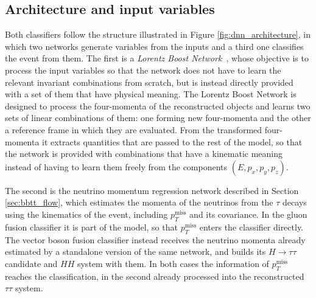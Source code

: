 \subsection{Architecture and input variables}
%
Both classifiers follow the structure illustrated in Figure \ref{fig:dnn_architecture}, in which two networks generate variables from the inputs and a third one classifies the event from them. The first is a \textit{Lorentz Boost Network}~\cite{LBN}, whose objective is to process the input variables so that the network does not have to learn the relevant invariant combinations from scratch, but is instead directly provided with a set of them that have physical meaning. The Lorentz Boost Network is designed to process the four-momenta of the reconstructed objects and learns two sets of linear combinations of them: one forming new four-momenta and the other a reference frame in which they are evaluated. From the transformed four-momenta it extracts quantities that are passed to the rest of the model, so that the network is provided with combinations that have a kinematic meaning instead of having to learn them freely from the components $(E, p_x, p_y, p_z)$.

The second is the neutrino momentum regression network described in Section \ref{sec:bbtt_flow}, which estimates the momenta of the neutrinos from the $\tau$ decays using the kinematics of the event, including $p_T^\text{miss}$ and its covariance. In the gluon fusion classifier it is part of the model, so that $p_T^\text{miss}$ enters the classifier directly. The vector boson fusion classifier instead receives the neutrino momenta already estimated by a standalone version of the same network, and builds its $H\to\tau\tau$ candidate and $HH$ system with them. In both cases the information of $p_T^\text{miss}$ reaches the classification, in the second already processed into the reconstructed $\tau\tau$ system.

